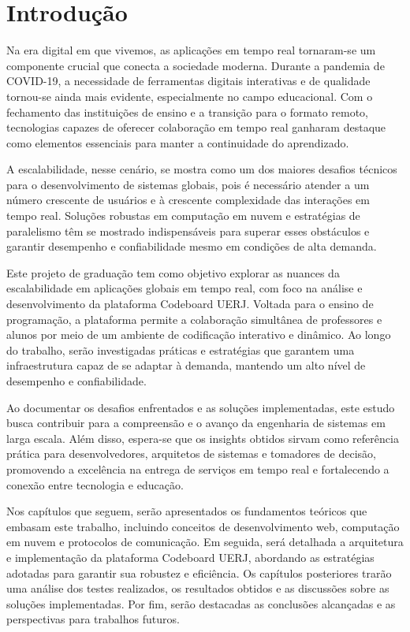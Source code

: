 \section*{Introdução}

Na era digital em que vivemos, as aplicações em tempo real tornaram-se um componente crucial que conecta a sociedade moderna. Durante a pandemia de COVID-19, a necessidade de ferramentas digitais interativas e de qualidade tornou-se ainda mais evidente, especialmente no campo educacional\cite{impact-covid19-teaching-learning}. Com o fechamento das instituições de ensino e a transição para o formato remoto, tecnologias capazes de oferecer colaboração em tempo real ganharam destaque como elementos essenciais para manter a continuidade do aprendizado.

A escalabilidade, nesse cenário, se mostra como um dos maiores desafios técnicos para o desenvolvimento de sistemas globais, pois é necessário atender a um número crescente de usuários e à crescente complexidade das interações em tempo real. Soluções robustas em computação em nuvem e estratégias de paralelismo têm se mostrado indispensáveis para superar esses obstáculos e garantir desempenho e confiabilidade mesmo em condições de alta demanda.

Este projeto de graduação tem como objetivo explorar as nuances da escalabilidade em aplicações globais em tempo real, com foco na análise e desenvolvimento da plataforma Codeboard UERJ. Voltada para o ensino de programação, a plataforma permite a colaboração simultânea de professores e alunos por meio de um ambiente de codificação interativo e dinâmico. Ao longo do trabalho, serão investigadas práticas e estratégias que garantem uma infraestrutura capaz de se adaptar à demanda, mantendo um alto nível de desempenho e confiabilidade.

Ao documentar os desafios enfrentados e as soluções implementadas, este estudo busca contribuir para a compreensão e o avanço da engenharia de sistemas em larga escala. Além disso, espera-se que os insights obtidos sirvam como referência prática para desenvolvedores, arquitetos de sistemas e tomadores de decisão, promovendo a excelência na entrega de serviços em tempo real e fortalecendo a conexão entre tecnologia e educação.

Nos capítulos que seguem, serão apresentados os fundamentos teóricos que embasam este trabalho, incluindo conceitos de desenvolvimento web, computação em nuvem e protocolos de comunicação. Em seguida, será detalhada a arquitetura e implementação da plataforma Codeboard UERJ, abordando as estratégias adotadas para garantir sua robustez e eficiência. Os capítulos posteriores trarão uma análise dos testes realizados, os resultados obtidos e as discussões sobre as soluções implementadas. Por fim, serão destacadas as conclusões alcançadas e as perspectivas para trabalhos futuros.